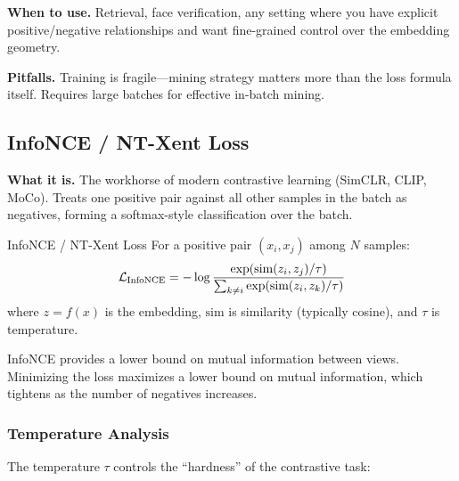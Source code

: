 \textbf{When to use.} Retrieval, face verification, any setting where you have explicit positive/negative relationships and want fine-grained control over the embedding geometry.

\textbf{Pitfalls.} Training is fragile---mining strategy matters more than the loss formula itself. Requires large batches for effective in-batch mining.

\subsection{InfoNCE / NT-Xent Loss}

\textbf{What it is.} The workhorse of modern contrastive learning (SimCLR, CLIP, MoCo). Treats one positive pair against all other samples in the batch as negatives, forming a softmax-style classification over the batch.

\begin{mathresult}{InfoNCE / NT-Xent Loss}
For a positive pair $(x_i, x_j)$ among $N$ samples:
\begin{equation}
\mathcal{L}_{\text{InfoNCE}} = -\log \frac{\exp(\text{sim}(z_i, z_j) / \tau)}{\sum_{k \neq i} \exp(\text{sim}(z_i, z_k) / \tau)}
\end{equation}
where $z = f(x)$ is the embedding, $\text{sim}$ is similarity (typically cosine), and $\tau$ is temperature.
\end{mathresult}

InfoNCE provides a lower bound on mutual information between views. Minimizing the loss maximizes a lower bound on mutual information, which tightens as the number of negatives increases.

\subsubsection{Temperature Analysis}

The temperature $\tau$ controls the ``hardness'' of the contrastive task:

